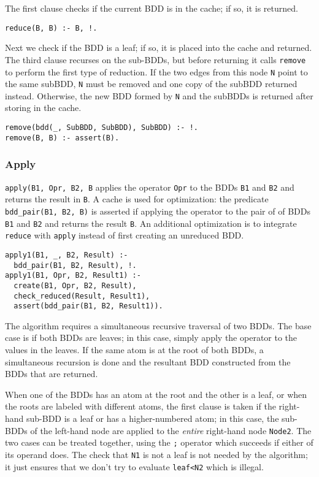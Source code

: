 \documentclass[11pt]{article}
\newcommand*{\p}[1]{\textup{\texttt{#1}}}
\begin{document}
The first clause checks if the current BDD is in the cache; if so,
it is returned.

\begin{verbatim}
reduce(B, B) :- B, !.
\end{verbatim}

Next we check if the BDD is a leaf; if so, it is placed into the cache
and returned. The third clause recurses on the sub-BDDs, but before
returning it calls \p{remove} to perform the first type of reduction. If
the two edges from this node \p{N} point to the same subBDD, \p{N} must
be removed and one copy of the subBDD returned instead. Otherwise, the
new BDD formed by \p{N} and the subBDDs is returned after storing in the
cache.

\begin{verbatim}
remove(bdd(_, SubBDD, SubBDD), SubBDD) :- !.
remove(B, B) :- assert(B).
\end{verbatim}

\subsubsection{Apply}

\p{apply(B1, Opr, B2, B} applies the operator \p{Opr} to
the BDDs \p{B1} and \p{B2} and returns the result in \p{B}. A cache is
used for optimization: the predicate \p{bdd\_pair(B1, B2, B)} is
asserted if applying the operator to the pair of of BDDs \p{B1} and
\p{B2} and returns the result \p{B}. An additional optimization is to
integrate \p{reduce} with \p{apply} instead of first creating an
unreduced BDD.

\begin{verbatim}
apply1(B1, _, B2, Result) :-
  bdd_pair(B1, B2, Result), !.
apply1(B1, Opr, B2, Result1) :-
  create(B1, Opr, B2, Result),
  check_reduced(Result, Result1),
  assert(bdd_pair(B1, B2, Result1)).
\end{verbatim}

The algorithm requires a simultaneous recursive traversal of two BDDs.
The base case is if both BDDs are leaves; in this case, simply apply the
operator to the values in the leaves. If the same atom is at the root of
both BDDs, a simultaneous recursion is done and the resultant BDD
constructed from the BDDs that are returned.

When one of the BDDs has an atom at the root and the other is a leaf, or
when the roots are labeled with different atoms, the first clause is
taken if the right-hand sub-BDD is a leaf or has a higher-numbered atom;
in this case, the sub-BDDs of the left-hand node are applied to the
\emph{entire} right-hand node \p{Node2}. The two cases can be treated
together, using the \p{;} operator which succeeds if either of its
operand does. The check that \p{N1} is not a leaf is not needed by the
algorithm; it just ensures that we don't try to evaluate \p{leaf<N2}
which is illegal.
\end{document}
